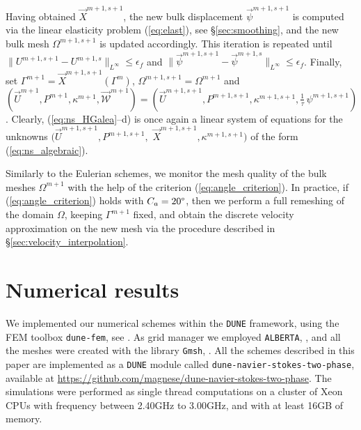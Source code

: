 \documentclass[a4paper,12pt,onecolumn]{article}
\newcommand{\W}{\vec{\mathcal W}}
\newcommand{\myurl}[1]{\hfil\penalty 100 \hfilneg \hbox{\url{#1}}} %
\begin{document}
Having obtained $\vec X^{m+1,s+1}$, the new bulk displacement
$\vec \psi^{m+1,s+1}$ is computed via the linear elasticity problem
(\ref{eq:elast}), see \S\ref{sec:smoothing},
and the new bulk mesh $\Omega^{m+1,s+1}$ is updated accordingly.
This iteration is repeated until $\|U^{m+1,s+1}-U^{m+1,s}\|_{L^\infty}
\leq\epsilon_f$ and $\|\vec \psi^{m+1,s+1}-\vec \psi^{m+1,s}\|_{L^\infty}
\leq\epsilon_f$.
Finally, set
$\Gamma^{m+1} = \vec X^{m+1,s+1}(\Gamma^m)$, $\Omega^{m+1,s+1}=\Omega^{m+1}$
and \linebreak $(\vec U^{m+1}, P^{m+1}, \kappa^{m+1},\W^{m+1}) =
(\vec U^{m+1,s+1}, P^{m+1,s+1},\kappa^{m+1,s+1},\tfrac1\tau\,\psi^{m+1,s+1})$.
Clearly, \linebreak
\mbox{(\ref{eq:ns_HGalea}--d)} is once again
a linear system of equations for the unknowns
$(\vec U^{m+1,s+1}, P^{m+1,s+1},$ $ \vec X^{m+1,s+1},
\kappa^{m+1,s+1})$ of the form (\ref{eq:ns_algebraic}).

Similarly to the Eulerian schemes, we monitor the mesh quality of
the bulk meshes $\Omega^{m+1}$ with the help of the criterion
(\ref{eq:angle_criterion}). In practice, if (\ref{eq:angle_criterion})
holds with $C_a=20\degree$, then we perform a full remeshing of the domain
$\Omega$, keeping $\Gamma^{m+1}$ fixed, and obtain the discrete velocity
approximation on the new mesh via the procedure described in
\S\ref{sec:velocity_interpolation}.

\setcounter{equation}{0}
\section{Numerical results} \label{sec:nr}

We implemented our numerical schemes within the \verb|DUNE| framework,
using the FEM toolbox \verb|dune-fem|, see
\cite{dunegridpaperI08,dunegridpaperII08,dunefempaper10}.
As grid manager we employed \verb|ALBERTA|, \cite{Alberta},
and all the meshes were created with the library \verb|Gmsh|,
\cite{GeuzaineR09}. All the schemes described in this paper are implemented as
a \verb|DUNE| module called \verb|dune-navier-stokes-two-phase|, available at
\myurl{https://github.com/magnese/dune-navier-stokes-two-phase}.
The simulations were performed as single thread computations on a cluster of
Xeon CPUs with frequency between 2.40GHz to 3.00GHz, and with at
least 16GB of memory.
\end{document}
